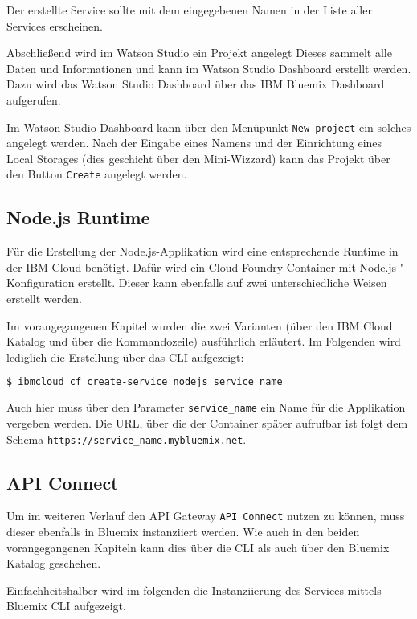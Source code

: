 Der erstellte Service sollte mit dem eingegebenen Namen in der Liste aller Services erscheinen.

Abschließend wird im Watson Studio ein Projekt angelegt Dieses sammelt alle Daten und Informationen und kann im Watson
Studio Dashboard erstellt werden. Dazu wird das Watson Studio Dashboard über das IBM Bluemix Dashboard aufgerufen.

Im Watson Studio Dashboard kann über den Menüpunkt \texttt{New project} ein solches angelegt werden. Nach der Eingabe eines
Namens und der Einrichtung eines Local Storages (dies geschicht über den Mini-Wizzard) kann das Projekt über den Button
\texttt{Create} angelegt werden.

\subsection{Node.js Runtime}
\label{ssc:nodejs_runtime}
Für die Erstellung der Node.js-Applikation wird eine entsprechende Runtime in der IBM Cloud benötigt. Dafür wird ein
Cloud Foundry-Container mit Node.js-"-Konfiguration erstellt. Dieser kann ebenfalls auf zwei unterschiedliche Weisen erstellt
werden.

Im vorangegangenen Kapitel wurden die zwei Varianten (über den IBM Cloud Katalog und über die Kommandozeile) ausführlich
erläutert. Im Folgenden wird lediglich die Erstellung über das CLI aufgezeigt:

\begin{lstlisting}[language=bash, caption=Instanziierung der Node.js Runtime, label=Instanziierung der Node.JS Runtime]
    $ ibmcloud cf create-service nodejs service_name
\end{lstlisting}

Auch hier muss über den Parameter \texttt{service\_name} ein Name für die Applikation vergeben werden. Die URL, über die
der Container später aufrufbar ist folgt dem Schema \texttt{https://service\_name.mybluemix.net}.

\subsection{API Connect}
\label{subsec:apiconnect}
Um im weiteren Verlauf den API Gateway \texttt{API Connect} nutzen zu können, muss dieser ebenfalls in Bluemix instanziiert
werden. Wie auch in den beiden vorangegangenen Kapiteln kann dies über die CLI als auch über den Bluemix Katalog geschehen.

Einfachheitshalber wird im folgenden die Instanziierung des Services mittels Bluemix CLI aufgezeigt.

